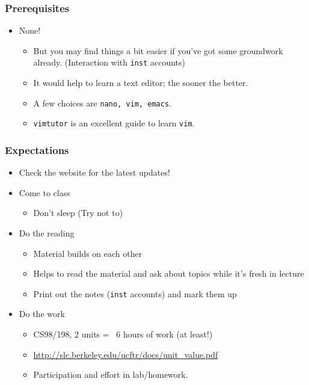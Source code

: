 \documentclass[14pt]{beamer}
\begin{document}
\begin{frame}
	\frametitle{Prerequisites}
	\begin{itemize}
		\item None!
		\begin{itemize}
			\item But you may find things a bit easier if you've got some groundwork already. (Interaction with \texttt{inst} accounts)
			\item It would help to learn a text editor; the sooner the better. 
			\item A few choices are \texttt{nano, vim, emacs}.
			\item \texttt{vimtutor} is an excellent guide to learn \texttt{vim}.
		\end{itemize}
	\end{itemize}
\end{frame}

\begin{frame}
	\frametitle{Expectations}
	\begin{itemize}
	  \item Check the website for the latest updates!
		\item Come to class
		\begin{itemize}
			\item Don't sleep (Try not to)
		\end{itemize}
		\item Do the reading
		\begin{itemize}
		  \item Material builds on each other
		  \item Helps to read the material and ask about topics while it's fresh in lecture
		  \item Print out the notes (\texttt{inst} accounts) and mark them up
		\end{itemize}
		\item Do the work
		\begin{itemize}
			\item CS98/198, 2 units = ~6 hours of work (at least!)
			\item \url{http://slc.berkeley.edu/ucftr/docs/unit_value.pdf}
			\item Participation and effort in lab/homework. 
		\end{itemize}
	\end{itemize}
\end{frame}
\end{document}

